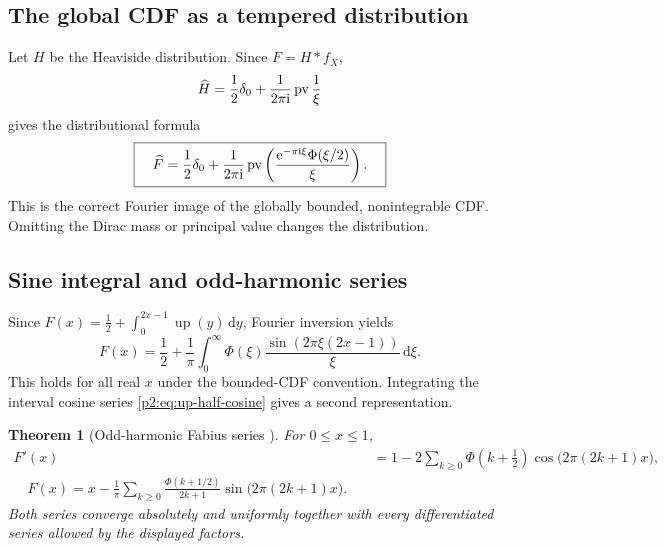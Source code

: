 \documentclass[11pt]{article}
\newtheorem{theorem}{Theorem}[section]
\theoremstyle{definition}
\theoremstyle{remark}
\newcommand{\dd}{\,\mathrm d}
\newcommand{\Up}{\operatorname{up}}
\begin{document}
\subsection{The global CDF as a tempered distribution}

Let $H$ be the Heaviside distribution.  Since $F=H\ast f_X$,
\begin{equation}
 \widehat H=\frac12\delta_0+\frac{1}{2\pi\mathrm i}\operatorname{pv}\frac1\xi
\end{equation}
gives the distributional formula
\begin{equation}
 \boxed{\quad
 \widehat F
 =\frac12\delta_0+
 \frac{1}{2\pi\mathrm i}\operatorname{pv}\left(
 \frac{\mathrm e^{-\pi\mathrm i\xi}\Phi(\xi/2)}{\xi}
 \right).
 \quad}                                                  \label{p2:eq:F-distribution-transform}
\end{equation}
This is the correct Fourier image of the globally bounded, nonintegrable CDF.  Omitting the
Dirac mass or principal value changes the distribution.

\subsection{Sine integral and odd-harmonic series}

Since $F(x)=\tfrac12+\int_0^{2x-1}\Up(y)\dd y$, Fourier inversion yields
\begin{equation}
 \boxed{\quad
 F(x)=\frac12+\frac1\pi\int_0^\infty
 \Phi(\xi)\frac{\sin(2\pi\xi(2x-1))}{\xi}\dd\xi.
 \quad}                                                  \label{p2:eq:F-sine-integral}
\end{equation}
This holds for all real $x$ under the bounded-CDF convention.  Integrating the interval
cosine series \eqref{p2:eq:up-half-cosine} gives a second representation.

\begin{theorem}[Odd-harmonic Fabius series \New]
For $0\le x\le1$,
{\small
\begin{align}
 F'(x)
 &=1-2\sum_{k\ge0}\Phi\left(k+\frac12\right)
 \cos\bigl(2\pi(2k+1)x\bigr),                            \label{p2:eq:Fprime-series}\\
 \boxed{\quad
 F(x)=x-\frac1\pi\sum_{k\ge0}
 \frac{\Phi(k+1/2)}{2k+1}
 \sin\bigl(2\pi(2k+1)x\bigr).
 \quad}                                                  \label{p2:eq:F-sine-series}
\end{align}
}
Both series converge absolutely and uniformly together with every differentiated series
allowed by the displayed factors.
\end{theorem}
\end{document}
